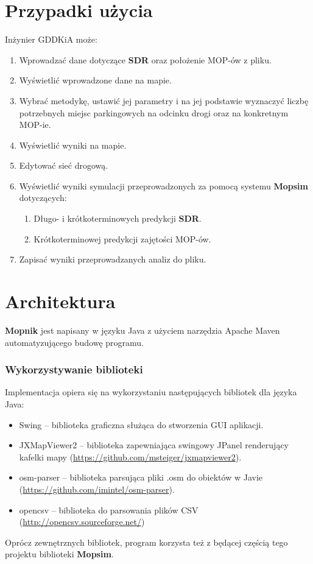 \section{Przypadki użycia}
Inżynier GDDKiA może:
\begin{enumerate}
  \item Wprowadzać dane dotyczące \textbf{SDR} oraz położenie MOP-ów z pliku.
  \item Wyświetlić wprowadzone dane na mapie.
  \item Wybrać metodykę, ustawić jej parametry i na jej podstawie wyznaczyć
    liczbę potrzebnych miejsc parkingowych na odcinku drogi oraz na konkretnym
    MOP-ie.
  \item Wyświetlić wyniki na mapie.
  \item Edytować sieć drogową. 
  \item Wyświetlić wyniki symulacji przeprowadzonych za pomocą systemu
    \textbf{Mopsim} dotyczących:
    \begin{enumerate}
      \item Długo- i krótkoterminowych predykcji \textbf{SDR}.
      \item Krótkoterminowej predykcji zajętości MOP-ów.
    \end{enumerate}
  \item Zapisać wyniki przeprowadzanych analiz do pliku.
\end{enumerate}

\section{Architektura}
\textbf{Mopnik} jest napisany w języku Java z użyciem narzędzia Apache
Maven automatyzującego budowę programu.
\subsubsection{Wykorzystywanie biblioteki}
Implementacja opiera się na wykorzystaniu następujących bibliotek dla języka
Java:
\begin{itemize}
\item Swing -- biblioteka graficzna służąca do stworzenia GUI aplikacji.
\item JXMapViewer2 -- biblioteka zapewniająca swingowy JPanel renderujący
  kafelki mapy (\url{https://github.com/msteiger/jxmapviewer2}).
\item osm-parser -- biblioteka parsująca pliki .osm do obiektów w Javie
  (\url{https://github.com/imintel/osm-parser}).
\item opencsv -- biblioteka do parsowania plików CSV
  (\url{http://opencsv.sourceforge.net/})
\end{itemize}
Oprócz zewnętrznych bibliotek, program korzysta też z będącej częścią tego
projektu biblioteki \textbf{Mopsim}. 
